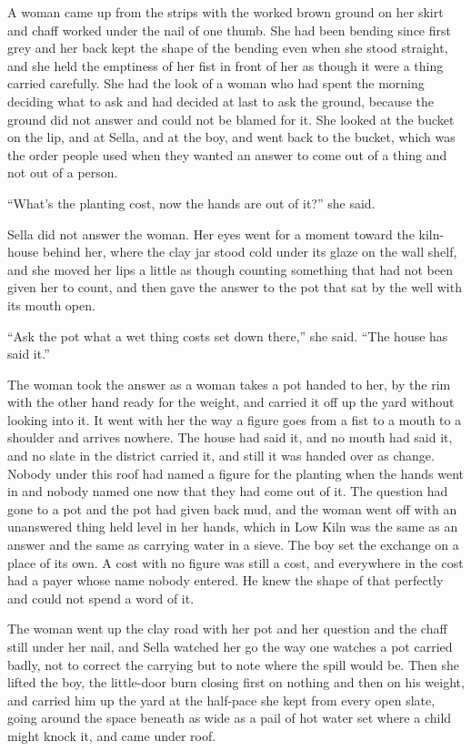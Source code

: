 A woman came up from the strips with the worked brown ground on her skirt and chaff worked under the nail of one thumb. She had been bending since first grey and her back kept the shape of the bending even when she stood straight, and she held the emptiness of her fist in front of her as though it were a thing carried carefully. She had the look of a woman who had spent the morning deciding what to ask and had decided at last to ask the ground, because the ground did not answer and could not be blamed for it. She looked at the bucket on the lip, and at Sella, and at the boy, and went back to the bucket, which was the order people used when they wanted an answer to come out of a thing and not out of a person.

“What's the planting cost, now the hands are out of it?” she said.

Sella did not answer the woman. Her eyes went for a moment toward the kiln-house behind her, where the clay jar stood cold under its glaze on the wall shelf, and she moved her lips a little as though counting something that had not been given her to count, and then gave the answer to the pot that sat by the well with its mouth open.

“Ask the pot what a wet thing costs set down there,” she said. “The house has said it.”

The woman took the answer as a woman takes a pot handed to her, by the rim with the other hand ready for the weight, and carried it off up the yard without looking into it. It went with her the way a figure goes from a fist to a mouth to a shoulder and arrives nowhere. The house had said it, and no mouth had said it, and no slate in the district carried it, and still it was handed over as change. Nobody under this roof had named a figure for the planting when the hands went in and nobody named one now that they had come out of it. The question had gone to a pot and the pot had given back mud, and the woman went off with an unanswered thing held level in her hands, which in Low Kiln was the same as an answer and the same as carrying water in a sieve. The boy set the exchange on a place of its own. A cost with no figure was still a cost, and everywhere in  the cost had a payer whose name nobody entered. He knew the shape of that perfectly and could not spend a word of it.

The woman went up the clay road with her pot and her question and the chaff still under her nail, and Sella watched her go the way one watches a pot carried badly, not to correct the carrying but to note where the spill would be. Then she lifted the boy, the little-door burn closing first on nothing and then on his weight, and carried him up the yard at the half-pace she kept from every open slate, going around the space beneath  as wide as a pail of hot water set where a child might knock it, and came under  roof.

